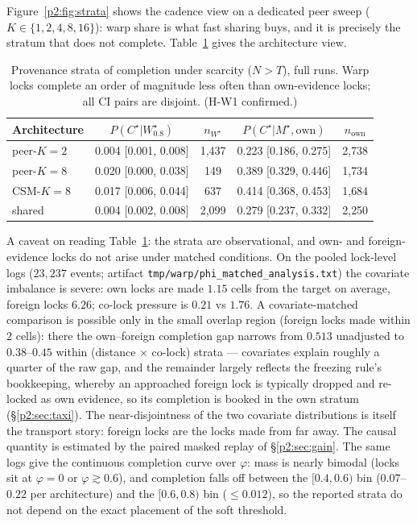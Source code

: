\documentclass{article}
\newcommand{\wstar}{W^{\star}}
\newcommand{\mstar}{M^{\star}}
\newcommand{\cstar}{C^{\star}}
\begin{document}
Figure~\ref{p2:fig:strata} shows the cadence view on a dedicated peer
sweep ($K\in\{1,2,4,8,16\}$): warp share is what fast sharing buys,
and it is precisely the stratum that does not complete.
Table~\ref{p2:tab:hw1} gives the architecture view.

\begin{table}[h]
\centering
\caption{Provenance strata of completion under scarcity ($N>T$), full
runs. Warp locks complete an order of magnitude less often than
own-evidence locks; all CI pairs are disjoint. (H-W1 confirmed.)}
\label{p2:tab:hw1}
\small
\begin{tabular}{lcccc}
\toprule
Architecture & $P(\cstar|\wstar_{0.8})$ & $n_{\wstar}$ & $P(\cstar|\mstar,\text{own})$ & $n_{\text{own}}$ \\
\midrule
peer-$K{=}2$ & 0.004 [0.001, 0.008] & 1{,}437 & 0.223 [0.186, 0.275] & 2{,}738 \\
peer-$K{=}8$ & 0.020 [0.000, 0.038] & 149    & 0.389 [0.329, 0.446] & 1{,}734 \\
CSM-$K{=}8$  & 0.017 [0.006, 0.044] & 637    & 0.414 [0.368, 0.453] & 1{,}684 \\
shared       & 0.004 [0.002, 0.008] & 2{,}099 & 0.279 [0.237, 0.332] & 2{,}250 \\
\bottomrule
\end{tabular}
\end{table}

A caveat on reading Table~\ref{p2:tab:hw1}: the strata are
observational, and own- and foreign-evidence locks do not arise under
matched conditions. On the pooled lock-level logs ($23{,}237$ events;
artifact \texttt{tmp/warp/phi\_matched\_analysis.txt}) the covariate
imbalance is severe: own locks are made $1.15$ cells from the target
on average, foreign locks $6.26$; co-lock pressure is $0.21$ vs
$1.76$. A covariate-matched comparison is possible only in the small
overlap region (foreign locks made within $2$ cells): there the
own--foreign completion gap narrows from $0.513$ unadjusted to
$0.38$--$0.45$ within (distance $\times$ co-lock) strata --- covariates
explain roughly a quarter of the raw gap, and the remainder largely
reflects the freezing rule's bookkeeping, whereby an approached
foreign lock is typically dropped and re-locked as own evidence, so
its completion is booked in the own stratum
(\S\ref{p2:sec:taxi}). The near-disjointness of the two covariate
distributions is itself the transport story: foreign locks are the
locks made from far away. The causal quantity is estimated by the
paired masked replay of \S\ref{p2:sec:gain}. The same logs give the
continuous completion curve over $\varphi$: mass is nearly bimodal
(locks sit at $\varphi{=}0$ or $\varphi \gtrsim 0.6$), and completion
falls off between the $[0.4,0.6)$ bin ($0.07$--$0.22$ per
architecture) and the $[0.6,0.8)$ bin ($\le 0.012$), so the reported
strata do not depend on the exact placement of the soft threshold.
\end{document}
